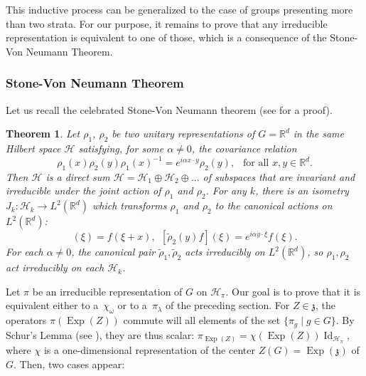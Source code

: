\documentclass[JEP,XML,SOM,Unicode,published]{cedram}
\let\mathcal\mathscr
\let\sep\mid
\DeclareMathOperator{\Exp}{Exp}
\DeclareMathOperator{\Id}{Id}
\theoremstyle{plain}
\newtheorem{theorem}{Theorem}[section]
\theoremstyle{definition}
\def\R{{\mathbb R}}
\begin{document}
This inductive process can be generalized to the case of groups presenting more than two strata. For our purpose,
it remains to prove that any irreducible representation is equivalent to one of those, which is a consequence of the Stone-Von Neumann Theorem.

\subsubsection{Stone-Von Neumann Theorem}
Let us recall the celebrated Stone-Von Neumann theorem (see \cite[\S 2.2.9]{CG} for a proof).
\begin{theorem}
Let $\rho_1$, $\rho_2$ be two unitary representations of $G=\R^d$ in the same Hilbert space $\mathcal{H}$ satisfying, for some $\alpha\neq 0$, the covariance relation
\begin{equation*}
\rho_1(x)\rho_2(y)\rho_1(x)^{-1}=e^{i\alpha x\cdot y}\rho_2(y), \ \ \text{ for all $x,y\in\R^d$}.
\end{equation*}
Then $\mathcal{H}$ is a direct sum $\mathcal{H}=\mathcal{H}_1\oplus \mathcal{H}_2\oplus\ldots$ of subspaces that are invariant and irreducible under the joint action of $\rho_1$ and $\rho_2$. For any $k$, there is an isometry $J_k:\mathcal{H}_k\to L^2(\R^d)$ which transforms $\rho_1$ and $\rho_2$ to the canonical actions on $L^2(\R^d)$:
\begin{equation*}
[\widetilde{\rho}_1(x)f](\xi)=f(\xi+x), \ \ [\widetilde{\rho}_2(y)f](\xi)=e^{i\alpha y\cdot \xi}f(\xi).
\end{equation*}
For each $\alpha\neq 0$, the canonical pair $\widetilde{\rho}_1, \widetilde{\rho}_2$ acts irreducibly on $L^2(\R^d)$, so $\rho_1, \rho_2$ act irreducibly on each $\mathcal{H}_k$.
\end{theorem}

Let $\pi$ be an irreducible representation of $G$ on $\mathcal{H}_\pi$. Our goal is to prove that it is equivalent either to a~$\chi_\omega$ or to a~$\pi_\lambda$ of the preceding section. For $Z\in\mathfrak z$, the operators $\pi(\Exp(Z))$ commute will all elements of the set $\{\pi_g \sep g\in G\}$. By Schur's Lemma (see \cite[Lem.\,2.1.1]{CG}), they are thus scalar: $\pi_{\Exp(Z)}=\chi(\Exp(Z))\Id_{\mathcal{H}_\pi}$, where $\chi$ is a one-dimensional representation of the center $Z(G)=\Exp(\mathfrak z)$ of $G$. Then, two cases appear:
\end{document}
